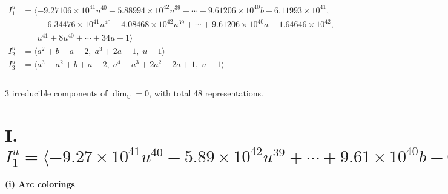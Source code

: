 \documentclass[1p]{elsarticle_modified}
\theoremstyle{definition}
\begin{document}
\begin{align*}
I^u_{1}&=\langle 
-9.27106\times10^{41} u^{40}-5.88994\times10^{42} u^{39}+\cdots+9.61206\times10^{40} b-6.11993\times10^{41},\\
\phantom{I^u_{1}}&\phantom{= \langle  }-6.34476\times10^{41} u^{40}-4.08468\times10^{42} u^{39}+\cdots+9.61206\times10^{40} a-1.64646\times10^{42},\\
\phantom{I^u_{1}}&\phantom{= \langle  }u^{41}+8 u^{40}+\cdots+34 u+1\rangle \\
I^u_{2}&=\langle 
a^2+b- a+2,\;a^3+2 a+1,\;u-1\rangle \\
I^u_{3}&=\langle 
a^3- a^2+b+a-2,\;a^4- a^3+2 a^2-2 a+1,\;u-1\rangle \\
\\
\end{align*}
\raggedright * 3 irreducible components of $\dim_{\mathbb{C}}=0$, with total 48 representations.\\
\newpage
\renewcommand{\arraystretch}{1}
\centering \section*{I. $I^u_{1}= \langle -9.27\times10^{41} u^{40}-5.89\times10^{42} u^{39}+\cdots+9.61\times10^{40} b-6.12\times10^{41},\;-6.34\times10^{41} u^{40}-4.08\times10^{42} u^{39}+\cdots+9.61\times10^{40} a-1.65\times10^{42},\;u^{41}+8 u^{40}+\cdots+34 u+1 \rangle$}
\flushleft \textbf{(i) Arc colorings}\\
\end{document}
